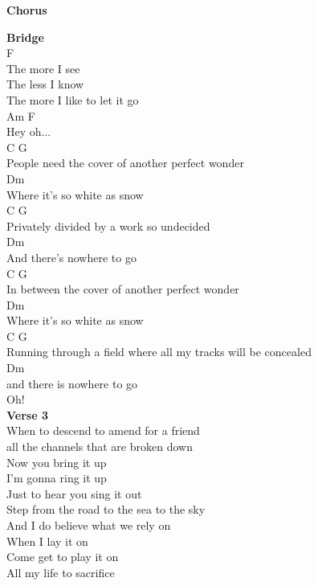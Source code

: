 \documentclass[a4paper]{article}
\begin{document}
{{        }
        \textbf{Chorus}
        ~\\
        {
            \cutive
            \obeyspaces

        }
        \textbf{Bridge}
        ~\\
        {
            \cutive
            \obeyspaces
F
\\
The more I see
\\
The less I know
\\
The more I like to let it go
\\
Am       F
\\
Hey oh...
\\
C                         G
\\
People need the cover of another perfect wonder
\\
Dm
\\
Where it's so white as snow
\\
C                      G
\\
Privately divided by a work so undecided
\\
              Dm  
\\
And there's nowhere to go
\\
C                         G
\\
In between the cover of another perfect wonder
\\
Dm
\\
Where it's so white as snow
\\
C                                     G
\\
Running through a field where all my tracks will be concealed
\\
             Dm
\\
and there is nowhere to go
\\
Oh!
\\

        }
        \textbf{Verse 3}
        ~\\
        {
            \cutive
            \obeyspaces
When to descend to amend for a friend
\\
all the channels that are broken down
\\
Now you bring it up
\\
I'm gonna ring it up
\\
Just to hear you sing it out
\\
Step from the road to the sea to the sky
\\
And I do believe what we rely on
\\
When I lay it on
\\
Come get to play it on
\\
All my life to sacrifice
\\

}}
\end{document}
